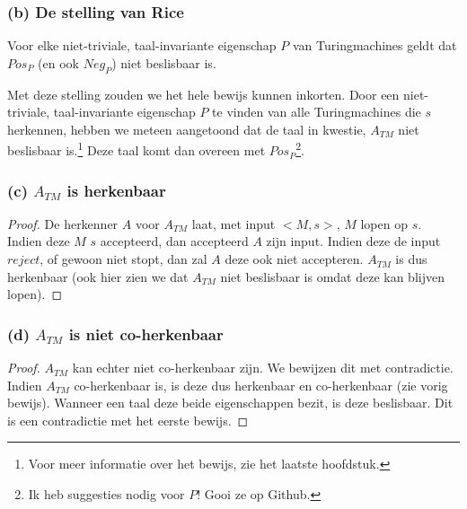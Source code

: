 \subsubsection*{(b) De stelling van Rice}

\begin{theorem}
	Voor elke niet-triviale, taal-invariante eigenschap $P$ van Turingmachines geldt dat $Pos_P$ (en ook $Neg_P$) niet beslisbaar is.
\end{theorem}

Met deze stelling zouden we het hele bewijs kunnen inkorten. Door een niet-triviale, taal-invariante eigenschap $P$ te vinden van alle Turingmachines die $s$ herkennen, hebben we meteen aangetoond dat de taal in kwestie, $A_{TM}$ niet beslisbaar is.\footnote{Voor meer informatie over het bewijs, zie het laatste hoofdstuk.} Deze taal komt dan overeen met $Pos_P$\footnote{Ik heb suggesties nodig voor $P$! Gooi ze op Github.}.

\subsubsection*{(c) $A_{TM}$ is herkenbaar}
\begin{proof}
	De herkenner $A$ voor $A_{TM}$ laat, met input $<M,s>$, $M$ lopen op $s$. Indien deze $M$ $s$ accepteerd, dan accepteerd $A$ zijn input. Indien deze de input $reject$, of gewoon niet stopt, dan zal $A$ deze ook niet accepteren. $A_{TM}$ is dus herkenbaar (ook hier zien we dat $A_{TM}$ niet beslisbaar is omdat deze kan blijven lopen).
\end{proof}

\subsubsection*{(d) $A_{TM}$ is niet co-herkenbaar}
\begin{proof}
	$A_{TM}$ kan echter niet co-herkenbaar zijn. We bewijzen dit met contradictie. Indien $A_{TM}$ co-herkenbaar is, is deze dus herkenbaar en co-herkenbaar (zie vorig bewijs). Wanneer een taal deze beide eigenschappen bezit, is deze beslisbaar. Dit is een contradictie met het eerste bewijs.
\end{proof}